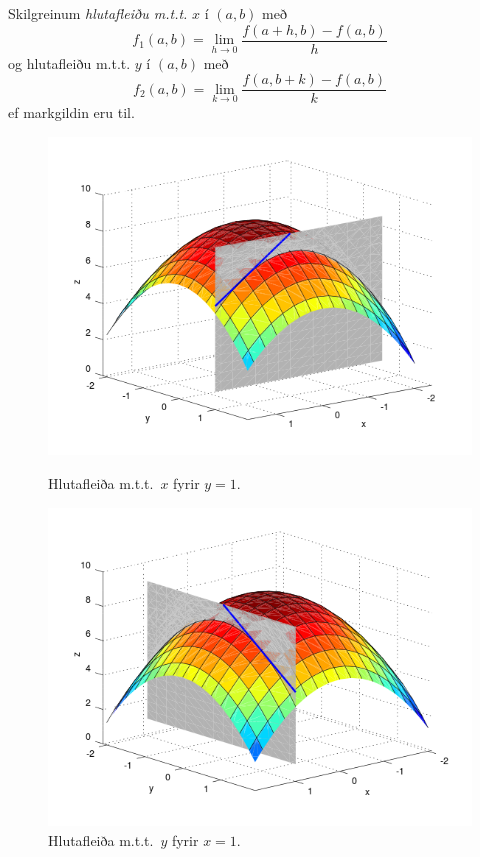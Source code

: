  \medskip
 Skilgreinum \emph{hlutafleiðu m.t.t.} $x$ í $(a,b)$ með
$$f_1(a,b)=\lim_{h\rightarrow 0}\frac{f(a+h,b)-f(a,b)}{h}$$
og {hlutafleiðu m.t.t.} $y$ í $(a,b)$ með
$$f_2(a,b)=\lim_{k\rightarrow 0}\frac{f(a,b+k)-f(a,b)}{k}$$
ef markgildin eru til.


 \begin{figure}[!h]
        \centering
        \begin{minipage}{.5\textwidth}
            \centering
            \includegraphics[width=1\linewidth]{xpart.png}
            \caption*{Hlutafleiða m.t.t.~$x$ fyrir $y=1$.}
        \end{minipage}%
        \begin{minipage}{.5\textwidth}
            \centering
            \includegraphics[width=1\linewidth]{ypart.png}
            \caption*{Hlutafleiða m.t.t.~$y$ fyrir $x=1$.}
        \end{minipage}
    \end{figure}
 



